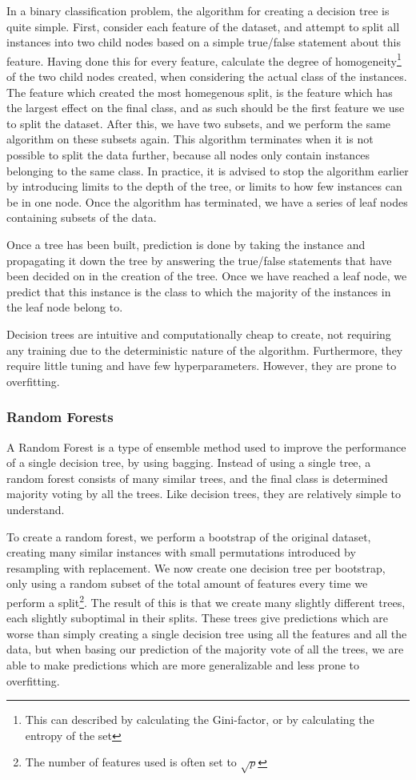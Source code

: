 \documentclass[onecolumn,10pt,cleanfoot]{asme2ej}
\begin{document}
In a binary classification problem, the algorithm for creating a decision tree is quite simple. First, consider each feature of the dataset, and attempt to split all instances into two child nodes based on a simple true/false statement about this feature. Having done this for every feature, calculate the degree of homogeneity\footnote{This can described by calculating the Gini-factor, or by calculating the entropy of the set} of the two child nodes created, when considering the actual class of the instances. The feature which created the most homegenous split, is the feature which has the largest effect on the final class, and as such should be the first feature we use to split the dataset. After this, we have two subsets, and we perform the same algorithm on these subsets again. This algorithm terminates when it is not possible to split the data further, because all nodes only contain instances belonging to the same class. In practice, it is advised to stop the algorithm earlier by introducing limits to the depth of the tree, or limits to how few instances can be in one node. Once the algorithm has terminated, we have a series of leaf nodes containing subsets of the data.

Once a tree has been built, prediction is done by taking the instance and propagating it down the tree by answering the true/false statements that have been decided on in the creation of the tree. Once we have reached a leaf node, we predict that this instance is the class to which the majority of the instances in the leaf node belong to.

Decision trees are intuitive and computationally cheap to create, not requiring any training due to the deterministic nature of the algorithm. Furthermore, they require little tuning and have few hyperparameters. However, they are prone to overfitting.

\subsubsection{Random Forests}

A Random Forest is a type of ensemble method used to improve the performance of a single decision tree, by using bagging. Instead of using a single tree, a random forest consists of many similar trees, and the final class is determined majority voting by all the trees. Like decision trees, they are relatively simple to understand.

To create a random forest, we perform a bootstrap of the original dataset, creating many similar instances with small permutations introduced by resampling with replacement. We now create one decision tree per bootstrap, only using a random subset of the total amount of features every time we perform a split\footnote{The number of features used is often set to $\sqrt{p}$}. The result of this is that we create many slightly different trees, each slightly suboptimal in their splits. These trees give predictions which are worse than simply creating a single decision tree using all the features and all the data, but when basing our prediction of the majority vote of all the trees, we are able to make predictions which are more generalizable and less prone to overfitting.
\end{document}

